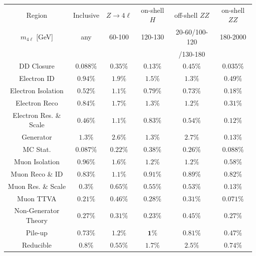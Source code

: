\begin{table}
    \centering 
     \begin{tabular} {c  c  c  c  c  c }
         \hline 
         Region  & Inclusive   & $Z\rightarrow 4\ell$   & on-shell $H$   & off-shell $ZZ$   & on-shell $ZZ$   \\
         $m_{4\ell}$ [GeV]  & any   & 60-100   & 120-130   & 20-60/100-120   & 180-2000   \\
            &       &       &       & /130-180 & \\
         \hline 
        DD Closure &  $ 0.088\% $  &  $ 0.35\% $  &  $ 0.13\% $  &  $ 0.45\% $  &  $ 0.035\% $ \\
        Electron ID &  $ 0.94\% $  &  $ \mathbf{1.9}\% $  &  $ \mathbf{1.5}\% $  &  $ \mathbf{1.3}\% $  &  $ 0.49\% $ \\
        Electron Isolation &  $ 0.52\% $  &  $ \mathbf{1.1}\% $  &  $ 0.79\% $  &  $ 0.73\% $  &  $ 0.18\% $ \\
        Electron Reco &  $ 0.84\% $  &  $ \mathbf{1.7}\% $  &  $ \mathbf{1.3}\% $  &  $ \mathbf{1.2}\% $  &  $ 0.31\% $ \\
        Electron Res. \& Scale &  $ 0.46\% $  &  $ \mathbf{1.1}\% $  &  $ 0.83\% $  &  $ 0.54\% $  &  $ 0.12\% $ \\
        Generator &  $ \mathbf{1.3}\% $  &  $ \mathbf{2.6}\% $  &  $ \mathbf{1.3}\% $  &  $ \mathbf{2.7}\% $  &  $ 0.13\% $ \\
        MC Stat. &  $ 0.087\% $  &  $ 0.22\% $  &  $ 0.38\% $  &  $ 0.26\% $  &  $ 0.088\% $ \\
        Muon Isolation &  $ 0.96\% $  &  $ \mathbf{1.6}\% $  &  $ \mathbf{1.2}\% $  &  $ \mathbf{1.2}\% $  &  $ 0.58\% $ \\
        Muon Reco \& ID &  $ 0.83\% $  &  $ \mathbf{1.1}\% $  &  $ 0.91\% $  &  $ 0.89\% $  &  $ 0.82\% $ \\
        Muon Res. \& Scale &  $ 0.3\% $  &  $ 0.65\% $  &  $ 0.55\% $  &  $ 0.53\% $  &  $ 0.13\% $ \\
        Muon TTVA &  $ 0.21\% $  &  $ 0.46\% $  &  $ 0.28\% $  &  $ 0.31\% $  &  $ 0.071\% $ \\
        Non-Generator Theory &  $ 0.27\% $  &  $ 0.31\% $  &  $ 0.23\% $  &  $ 0.45\% $  &  $ 0.27\% $ \\
        Pile-up &  $ 0.73\% $  &  $ \mathbf{1.2}\% $  &  $ \mathbf{1}\% $  &  $ 0.81\% $  &  $ 0.47\% $ \\
        Reducible &  $ 0.8\% $  &  $ 0.55\% $  &  $ \mathbf{1.7}\% $  &  $ \mathbf{2.5}\% $  &  $ 0.74\% $ \\

\end{tabular}
\end{table}
